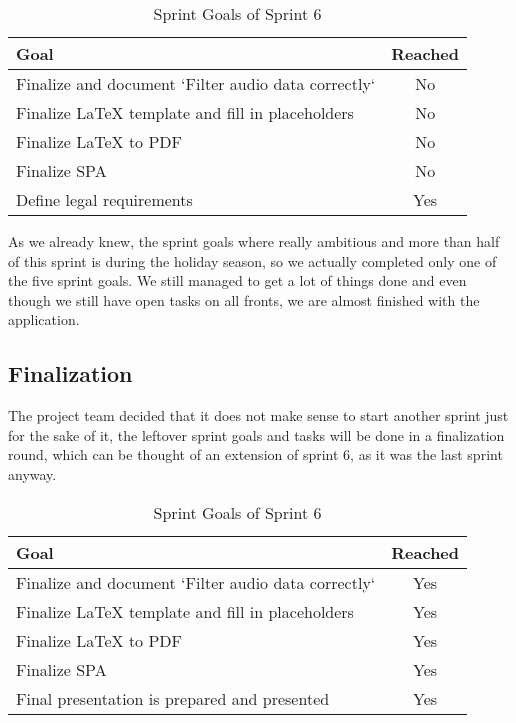 \begin{table}[H]
    \centering
    \begin{tabularx}{\textwidth}{X c}
        \toprule
        \textbf{Goal}                                         & \textbf{Reached} \\
        \midrule
        Finalize and document `Filter audio data correctly`   & No               \\
        \midrule
        Finalize LaTeX template and fill in placeholders      & No               \\
        \midrule
        Finalize LaTeX to PDF                                 & No               \\
        \midrule
        Finalize SPA                                          & No               \\
        \midrule
        Define legal requirements                             & Yes               \\
        \bottomrule
    \end{tabularx}
    \caption{Sprint Goals of Sprint 6}\label{tab:sprint_goals6}
\end{table}

As we already knew, the sprint goals where really ambitious and more than half of this sprint is during the holiday season,
so we actually completed only one of the five sprint goals.
We still managed to get a lot of things done and even though we still have open tasks on all fronts,
we are almost finished with the application.

\subsection{Finalization}\label{subsec:sprint-finalization}
The project team decided that it does not make sense to start another sprint just for the sake of it, the leftover
sprint goals and tasks will be done in a finalization round, which can be thought of an extension of sprint 6,
as it was the last sprint anyway.

\begin{table}[H]
    \centering
    \begin{tabularx}{\textwidth}{X c}
        \toprule
        \textbf{Goal}                                         & \textbf{Reached} \\
        \midrule
        Finalize and document `Filter audio data correctly`   & Yes              \\
        \midrule
        Finalize LaTeX template and fill in placeholders      & Yes              \\
        \midrule
        Finalize LaTeX to PDF                                 & Yes              \\
        \midrule
        Finalize SPA                                          & Yes              \\
        \midrule
        Final presentation is prepared and presented          & Yes              \\
        \bottomrule
    \end{tabularx}
    \caption{Sprint Goals of Sprint 6}\label{tab:sprint-finalization}
\end{table}
